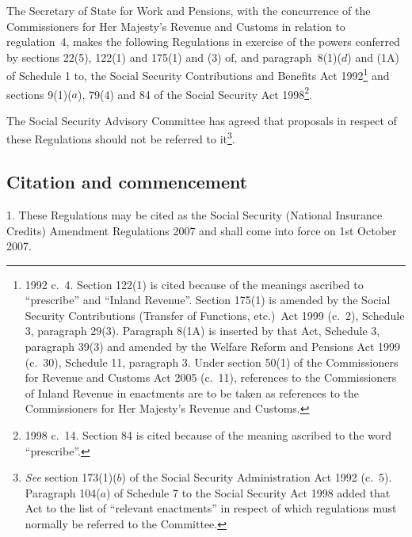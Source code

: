 \documentclass[12pt,a4paper]{article}
\title{\regstitle}
\author{S.I.\ 2007 No.\ 2582}
\date{Made
4th September 2007\\
Laid before Parliament
7th September 2007\\
Coming into~force
1st October 2007
}
\begin{document}
\maketitle

\noindent
The Secretary of State for Work and Pensions, with the concurrence of the Commissioners for Her Majesty’s Revenue and Customs in relation to regulation~4, makes the following Regulations in exercise of the powers conferred by sections 22(5), 122(1) and 175(1) and (3) of, and paragraph~8(1)($d$)  and (1A) of Schedule 1 to, the Social Security Contributions and Benefits Act 1992\footnote{1992 c.~4. Section 122(1) is cited because of the meanings ascribed to “prescribe” and “Inland Revenue”. Section 175(1) is amended by the Social Security Contributions (Transfer of Functions, etc.)\ Act 1999 (c.~2), Schedule 3, paragraph 29(3). Paragraph 8(1A) is inserted by that Act, Schedule 3, paragraph 39(3) and amended by the Welfare Reform and Pensions Act 1999 (c.~30), Schedule 11, paragraph 3. Under section 50(1) of the Commissioners for Revenue and Customs Act 2005 (c.~11), references to the Commissioners of Inland Revenue in enactments are to be taken as references to the Commissioners for Her Majesty’s Revenue and Customs.} and sections 9(1)($a$), 79(4) and 84 of the Social Security Act 1998\footnote{1998 c.~14. Section 84 is cited because of the meaning ascribed to the word “prescribe”.}.

The Social Security Advisory Committee has agreed that proposals in respect of these Regulations should not be referred to it\footnote{\emph{See} section 173(1)($b$)  of the Social Security Administration Act 1992 (c.~5). Paragraph 104($a$)  of Schedule 7 to the Social Security Act 1998 added that Act to the list of “relevant enactments” in respect of which regulations must normally be referred to the Committee.}. 

{\sloppy

\tableofcontents

}

\bigskip

\setcounter{secnumdepth}{-2}

\subsection[1. Citation and commencement]{Citation and commencement}

1.  These Regulations may be cited as the Social Security (National Insurance Credits) Amendment Regulations 2007 and shall come into force on 1st October 2007.
\end{document}

